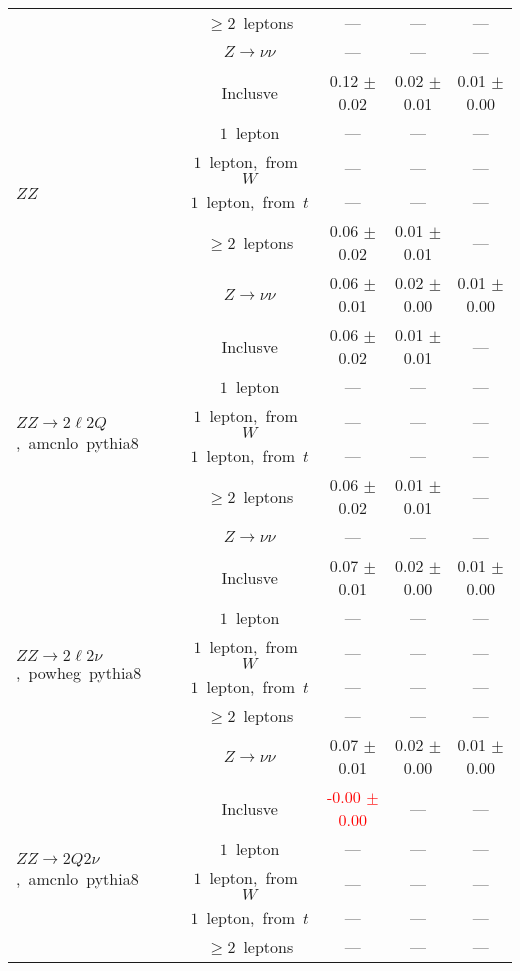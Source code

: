 \documentclass{article}
\begin{document}
\begin{longtable}{|l|c|c|c|c|}
 & $\ge2$~leptons  & ---  & ---  & --- \\* 
 & $Z\rightarrow\nu\nu$  & ---  & ---  & --- \\* 
\hline 
\multirow{6}{*}{$ZZ$} & Inclusve  & 0.12 $\pm$ 0.02  & 0.02 $\pm$ 0.01  & 0.01 $\pm$ 0.00 \\* 
 & $1$~lepton  & ---  & ---  & --- \\* 
 & $1$~lepton,~from~$W$  & ---  & ---  & --- \\* 
 & $1$~lepton,~from~$t$  & ---  & ---  & --- \\* 
 & $\ge2$~leptons  & 0.06 $\pm$ 0.02  & 0.01 $\pm$ 0.01  & --- \\* 
 & $Z\rightarrow\nu\nu$  & 0.06 $\pm$ 0.01  & 0.02 $\pm$ 0.00  & 0.01 $\pm$ 0.00 \\* 
\hline 
\multirow{6}{*}{$ZZ{\rightarrow}2{\ell}2Q$,~amcnlo~pythia8} & Inclusve  & 0.06 $\pm$ 0.02  & 0.01 $\pm$ 0.01  & --- \\* 
 & $1$~lepton  & ---  & ---  & --- \\* 
 & $1$~lepton,~from~$W$  & ---  & ---  & --- \\* 
 & $1$~lepton,~from~$t$  & ---  & ---  & --- \\* 
 & $\ge2$~leptons  & 0.06 $\pm$ 0.02  & 0.01 $\pm$ 0.01  & --- \\* 
 & $Z\rightarrow\nu\nu$  & ---  & ---  & --- \\* 
\hline 
\multirow{6}{*}{$ZZ{\rightarrow}2{\ell}2{\nu}$,~powheg~pythia8} & Inclusve  & 0.07 $\pm$ 0.01  & 0.02 $\pm$ 0.00  & 0.01 $\pm$ 0.00 \\* 
 & $1$~lepton  & ---  & ---  & --- \\* 
 & $1$~lepton,~from~$W$  & ---  & ---  & --- \\* 
 & $1$~lepton,~from~$t$  & ---  & ---  & --- \\* 
 & $\ge2$~leptons  & ---  & ---  & --- \\* 
 & $Z\rightarrow\nu\nu$  & 0.07 $\pm$ 0.01  & 0.02 $\pm$ 0.00  & 0.01 $\pm$ 0.00 \\* 
\hline 
\multirow{6}{*}{$ZZ{\rightarrow}2Q2{\nu}$,~amcnlo~pythia8} & Inclusve  & \textcolor{red}{ -0.00 $\pm$ 0.00 }  & ---  & --- \\* 
 & $1$~lepton  & ---  & ---  & --- \\* 
 & $1$~lepton,~from~$W$  & ---  & ---  & --- \\* 
 & $1$~lepton,~from~$t$  & ---  & ---  & --- \\* 
 & $\ge2$~leptons  & ---  & ---  & --- \\* 

\end{longtable}
\end{document}
